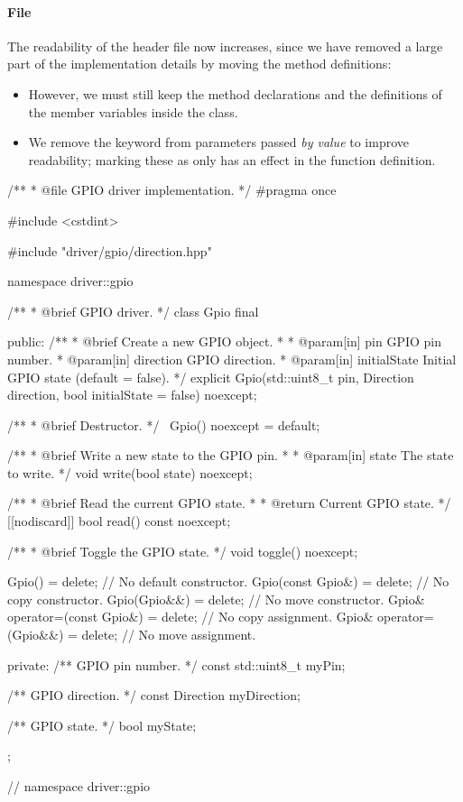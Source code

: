 \paragraph{File }
The readability of the header file  now increases, since we have removed
a large part of the implementation details by moving the method definitions:
\begin{itemize}
  \item However, we must still keep the method declarations and the definitions of the member
    variables inside the class.
  \item We remove the keyword  from parameters passed \emph{by value} to improve
    readability; marking these as  only has an effect in the function definition.
\end{itemize}

\begin{cppcode}
/**
 * @file GPIO driver implementation.
 */
#pragma once

#include <cstdint>

#include "driver/gpio/direction.hpp"

namespace driver::gpio
{
/**
 * @brief GPIO driver.
 */
class Gpio final
{
public:
    /**
     * @brief Create a new GPIO object.
     *
     * @param[in] pin GPIO pin number.
     * @param[in] direction GPIO direction.
     * @param[in] initialState Initial GPIO state (default = false).
     */
    explicit Gpio(std::uint8_t pin, Direction direction, bool initialState = false) noexcept;

    /**
     * @brief Destructor.
     */
    ~Gpio() noexcept = default;

    /**
     * @brief Write a new state to the GPIO pin.
     *
     * @param[in] state The state to write.
     */
    void write(bool state) noexcept;

    /**
     * @brief Read the current GPIO state.
     *
     * @return Current GPIO state.
     */
    [[nodiscard]] bool read() const noexcept;

    /**
     * @brief Toggle the GPIO state.
     */
    void toggle() noexcept;

    Gpio()                       = delete; // No default constructor.
    Gpio(const Gpio&)            = delete; // No copy constructor.
    Gpio(Gpio&&)                 = delete; // No move constructor.
    Gpio& operator=(const Gpio&) = delete; // No copy assignment.
    Gpio& operator=(Gpio&&)      = delete; // No move assignment.

private:
    /** GPIO pin number. */
    const std::uint8_t myPin;

    /** GPIO direction. */
    const Direction myDirection;

    /** GPIO state. */
    bool myState;
};
} // namespace driver::gpio
\end{cppcode}


